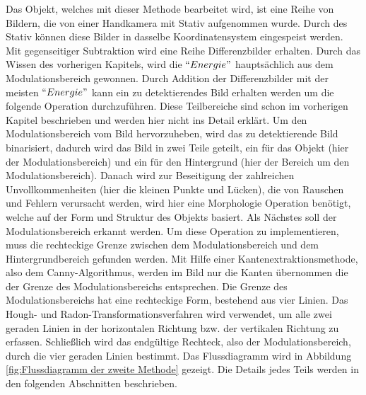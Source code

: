 Das Objekt, welches mit dieser Methode bearbeitet wird, ist eine Reihe von Bildern, die von einer Handkamera mit Stativ aufgenommen wurde. Durch des Stativ können diese Bilder in dasselbe Koordinatensystem eingespeist werden. Mit gegenseitiger Subtraktion wird eine Reihe Differenzbilder erhalten. Durch das Wissen des vorherigen Kapitels, wird die $``Energie"$ hauptsächlich aus dem Modulationsbereich gewonnen. Durch Addition der Differenzbilder mit der meisten $``Energie"$ kann ein zu detektierendes Bild erhalten werden um die folgende Operation durchzuführen. Diese Teilbereiche sind schon im vorherigen Kapitel beschrieben und werden hier nicht ins Detail erklärt. Um den Modulationsbereich vom Bild hervorzuheben, wird das zu detektierende Bild binarisiert, dadurch wird das Bild in zwei Teile geteilt, ein für das Objekt (hier der Modulationsbereich) und ein für den Hintergrund (hier der Bereich um den Modulationsbereich). Danach wird zur Beseitigung der zahlreichen Unvollkommenheiten (hier die kleinen Punkte und Lücken), die von Rauschen und Fehlern verursacht werden, wird hier eine Morphologie Operation benötigt, welche auf der Form und Struktur des Objekts basiert. Als Nächstes soll der Modulationsbereich erkannt werden. Um diese Operation zu implementieren, muss die rechteckige Grenze zwischen dem Modulationsbereich und dem Hintergrundbereich gefunden werden. Mit Hilfe einer Kantenextraktionsmethode, also dem Canny-Algorithmus, werden im Bild nur die Kanten übernommen die der Grenze des Modulationsbereichs entsprechen. Die Grenze des Modulationsbereichs hat eine rechteckige Form, bestehend aus vier Linien. Das Hough- und Radon-Transformationsverfahren wird verwendet, um alle zwei geraden Linien in der horizontalen Richtung bzw. der vertikalen Richtung zu erfassen. Schließlich wird das endgültige Rechteck, also der Modulationsbereich, durch die vier geraden Linien bestimmt. Das Flussdiagramm wird in Abbildung \ref{fig:Flussdiagramm der zweite Methode} gezeigt. Die Details jedes Teils werden in den folgenden Abschnitten beschrieben.

